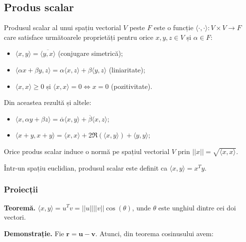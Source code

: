 \documentclass{exam}
\begin{document}
\subsection{Produs scalar}

\par Produsul scalar al unui spațiu vectorial $V$ peste $F$ este o funcție
$\langle \cdot, \cdot \rangle: V \times V \rightarrow F$ care satisface
următoarele proprietăți pentru orice $x, y, z \in V$ și $\alpha \in F$:

\begin{itemize}
	\item $\langle x, y \rangle = \overline{\langle y, x \rangle}$ (conjugare simetrică);
	\item $\langle \alpha x + \beta y, z \rangle = \alpha \langle x, z \rangle + \beta \langle y, z \rangle$ (liniaritate);
	\item $\langle x, x \rangle \geq 0$ și $\langle x, x \rangle = 0 \Leftrightarrow x = 0$ (pozitivitate).
\end{itemize}

\par Din aceastea rezultă și altele:

\begin{itemize}
	\item $\langle x, \alpha y + \beta z \rangle = \overline{\alpha} \langle x, y \rangle + \overline{\beta} \langle x, z \rangle$;
	\item $\langle x + y, x + y \rangle = \langle x, x \rangle + 2 \Re(\langle x, y \rangle) +\langle y, y \rangle$;
\end{itemize}

\par Orice produs scalar induce o normă pe spațiul vectorial $V$ prin
$||x|| = \sqrt{\langle x, x \rangle}$.

\par Într-un spațiu euclidian, produsul
scalar este definit ca $\langle x, y \rangle = x^Ty$.

\subsubsection{Proiecții}

\par \textbf{Teoremă.} $\langle x, y \rangle = u^Tv = ||u||||v||\cos(\theta)$, unde $\theta$ este unghiul dintre cei doi vectori.

\par \textbf{Demonstrație.} Fie $\mathbf{r} = \mathbf{u} - \mathbf{v}$. Atunci,
din teorema cosinusului avem:
\end{document}
